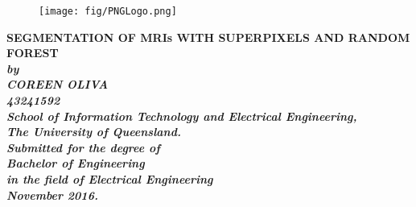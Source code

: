 \begin{titlepage}
		\begin{figure}
			\centering
			\texttt{[image: fig/PNGLogo.png]}
		\end{figure}
		
		\begin{center}
		\vspace*{15mm}
		\Huge\bf 
		SEGMENTATION OF MRIs WITH SUPERPIXELS
		AND RANDOM FOREST\\
		\vspace{20mm}
		\large\sl
			by\\
			COREEN OLIVA
			\\
			43241592
		\medskip\\
		\rm
		School of Information Technology and Electrical Engineering,			\\
		The University of Queensland.\\
		\vspace{30mm}
		Submitted for the degree of\\
		Bachelor of Engineering
		\smallskip\\
		\normalsize
		in the field of Electrical Engineering
		\medskip\\
		\large
		November 2016.		
		\end{center}
\end{titlepage}